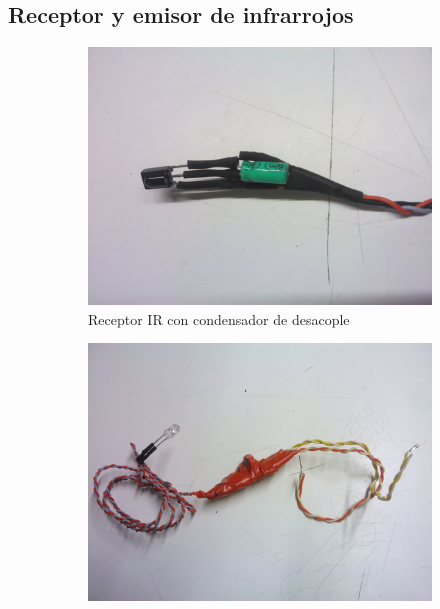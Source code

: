 \subsection{Receptor y emisor de infrarrojos}
\begin{figure}[!ht]
	\centering

	\begin{subfigure}[t]{0.4\textwidth}
		\centering
		\includegraphics[width=\textwidth]{images/comunicacion-receptor}
		\caption{Receptor IR con condensador de desacople}
		\label{fig:comunicacion-receptor}
	\end{subfigure}
	\hspace{0.5cm}
	\begin{subfigure}[t]{0.4\textwidth}
		\centering
		\includegraphics[width=\textwidth]{images/comunicacion-emisor}

\end{subfigure}
\end{figure}
